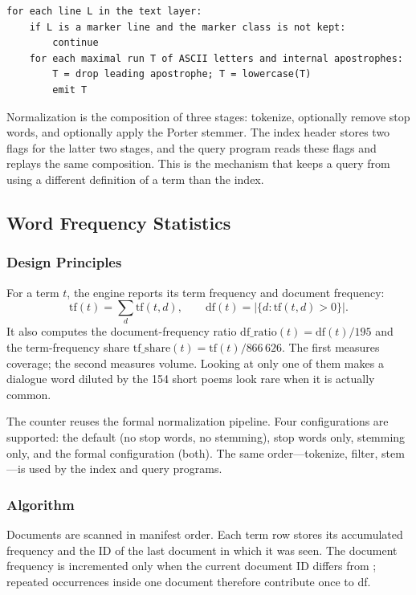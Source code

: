 \begin{lstlisting}[style=cli]
for each line L in the text layer:
    if L is a marker line and the marker class is not kept:
        continue
    for each maximal run T of ASCII letters and internal apostrophes:
        T = drop leading apostrophe; T = lowercase(T)
        emit T
\end{lstlisting}

Normalization is the composition of three stages: tokenize, optionally remove
stop words, and optionally apply the Porter stemmer. The index header stores
two flags for the latter two stages, and the query program reads these flags
and replays the same composition. This is the mechanism that keeps a query
from using a different definition of a term than the index.

\subsection{Word Frequency Statistics}
\label{sec:count-design}

\subsubsection{Design Principles}

For a term $t$, the engine reports its term frequency and document frequency:
\begin{equation}
  \mathrm{tf}(t)=\sum_{d}\mathrm{tf}(t,d),\qquad
  \mathrm{df}(t)=|\{d:\mathrm{tf}(t,d)>0\}|.
\end{equation}
It also computes the document-frequency ratio
$\mathrm{df\_ratio}(t)=\mathrm{df}(t)/195$ and the term-frequency share
$\mathrm{tf\_share}(t)=\mathrm{tf}(t)/866\,626$. The first measures coverage;
the second measures volume. Looking at only one of them makes a dialogue word
diluted by the 154 short poems look rare when it is actually common.

The counter reuses the formal normalization pipeline. Four configurations are
supported: the default (no stop words, no stemming), stop words only, stemming
only, and the formal configuration (both). The same order---tokenize, filter,
stem---is used by the index and query programs.

\subsubsection{Algorithm}

Documents are scanned in manifest order. Each term row stores its accumulated
frequency and the ID of the last document in which it was seen. The document
frequency is incremented only when the current document ID differs from
; repeated occurrences inside one document therefore contribute
once to df.

